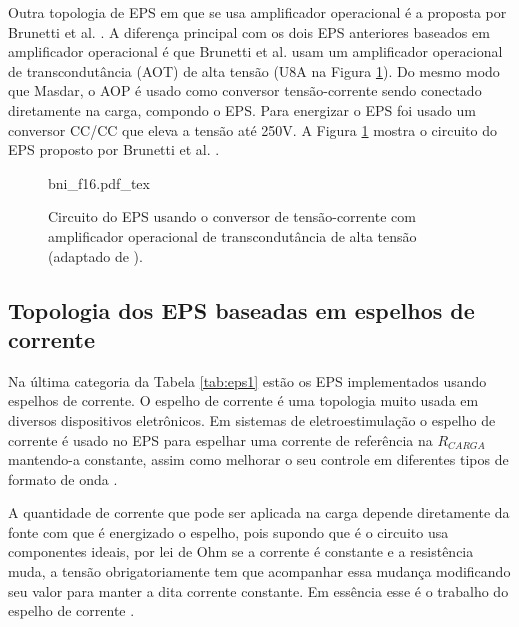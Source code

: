 Outra topologia de \acrshort{EPS} em que se usa amplificador operacional é a proposta por Brunetti et al. \cite{Brunetti2011EnhancingProject}. A diferença principal com os dois \acrshort{EPS} anteriores baseados em amplificador operacional é que Brunetti et al. usam um amplificador operacional de transcondutância (\acrshort{AOT}) de alta tensão (U8A na Figura \ref{fig:bni_f16}). Do mesmo modo que Masdar, o \acrshort{AOP} é usado como conversor tensão-corrente sendo conectado diretamente na carga, compondo o \acrshort{EPS}. Para energizar o \acrshort{EPS} foi usado um conversor CC/CC que eleva a tensão até 250V. A Figura \ref{fig:bni_f16} mostra o circuito do \acrshort{EPS} proposto por Brunetti et al. \cite{Brunetti2011EnhancingProject}.

\begin{figure}[h]
    \centering %
    \small %
    \def\svgwidth{0.57
    \columnwidth}%
    {bni_f16.pdf_tex}
    \caption{Circuito do EPS usando o conversor de tensão-corrente com amplificador operacional de transcondutância de alta tensão (adaptado de \cite{Brunetti2011EnhancingProject}).}
    \label{fig:bni_f16}
\end{figure}

\subsection*{Topologia dos \acrshort{EPS} baseadas em espelhos de corrente}
Na última categoria da Tabela \ref{tab:eps1} estão os EPS implementados usando espelhos de corrente. O espelho de corrente é uma topologia muito usada em diversos dispositivos eletrônicos. Em sistemas de eletroestimulação o espelho de corrente é usado no EPS para espelhar uma corrente de referência na $R_{CARGA}$ mantendo-a constante, assim como melhorar o seu controle em diferentes tipos de formato de onda \cite{Kaczmarek1991ASystem, Souza2017PowerSystems, Boylestad2013DispositivosCircuitos}. %

A quantidade de corrente que pode ser aplicada na carga depende diretamente da fonte com que é energizado o espelho, pois supondo que é o circuito usa componentes ideais, por lei de Ohm se a corrente é constante e a resistência muda, a tensão obrigatoriamente tem que acompanhar essa mudança modificando seu valor para manter a dita corrente constante. Em essência esse é o trabalho do espelho de corrente \cite{Boylestad2013DispositivosCircuitos}. %

